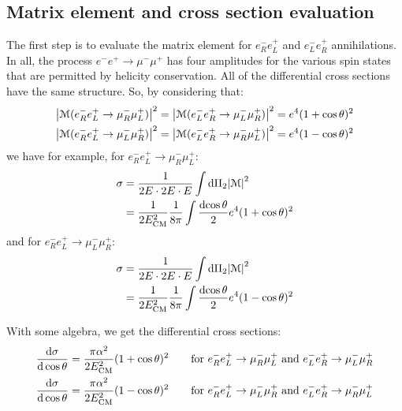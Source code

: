 \documentclass[../../main/main.tex]{subfiles}
\begin{document}
\subsection{Matrix element and cross section evaluation}
The first step is to evaluate the matrix element for \( e^-_R e^+_L \) and \( e^-_L e^+_R \) annihilations. In all, the process \( e^-e^+ \longrightarrow \mu^-\mu^+ \) has four amplitudes for the various spin states that are permitted by helicity conservation. All of the differential cross sections have the same structure. So, by considering that:
\begin{subequations}
	\begin{align}
		\abs{\mathcal{M}(e^-_R e^+_L \rightarrow \mu^-_R \mu^+_L)}^2
		&=
		\abs{\mathcal{M}(e^-_L e^+_R \rightarrow \mu^-_L \mu^+_R)}^2
		=
		e^4 (1 + \cos \theta)^2
		\\
		\abs{\mathcal{M}(e^-_R e^+_L \rightarrow \mu^-_L \mu^+_R)}^2
		&=
		\abs{\mathcal{M}(e^-_L e^+_R \rightarrow \mu^-_R \mu^+_L)}^2
		=
		e^4 (1 - \cos \theta)^2
	\end{align}
	\label{eq:L06_MEE}
\end{subequations}
we have for example, for \( e^-_R e^+_L \longrightarrow \mu^-_R \mu^+_L \):
\begin{align}
	\sigma 	&= \frac{1}{2E \cdot 2E \cdot E} \int \mathrm{d}{\Pi_2} \abs{\mathcal{M}}^2 \nonumber \\
	 		&= \frac{1}{2E^2_\mathrm{CM}} \frac{1}{8\pi} \int \frac{\mathrm{d}{\cos \theta}}{2} e^4 (1 + \cos \theta)^2
	\label{eq:L06_CSI_1}
\end{align}
and for \( e^-_R e^+_L \longrightarrow \mu^-_L \mu^+_R \):
\begin{align}
	\sigma 	&= \frac{1}{2E \cdot 2E \cdot E} \int \mathrm{d}{\Pi_2} \abs{\mathcal{M}}^2 \nonumber \\
	 		&= \frac{1}{2E^2_\mathrm{CM}} \frac{1}{8\pi} \int \frac{\mathrm{d}{\cos \theta}}{2} e^4 (1 - \cos \theta)^2
	\label{eq:L06_CSI_2}
\end{align}

With some algebra, we get the differential cross sections:
\begin{subequations}
	\begin{align}
		\dv{\sigma}{\cos \theta}	&=	\frac{\pi \alpha^2}{2E^2_\mathrm{CM}} (1 + \cos \theta)^2
		\qquad \text{for} \ e^-_R e^+_L \rightarrow \mu^-_R \mu^+_L \ \text{and} \ e^-_L e^+_R \rightarrow \mu^-_L \mu^+_R
		\\
		\dv{\sigma}{\cos \theta}	&=	\frac{\pi \alpha^2}{2E^2_\mathrm{CM}} (1 - \cos \theta)^2
		\qquad \text{for} \ e^-_R e^+_L \rightarrow \mu^-_L \mu^+_R \ \text{and} \ e^-_L e^+_R \rightarrow \mu^-_R \mu^+_L
	\end{align}
	\label{eq:L06_DCS}
\end{subequations}
\end{document}
